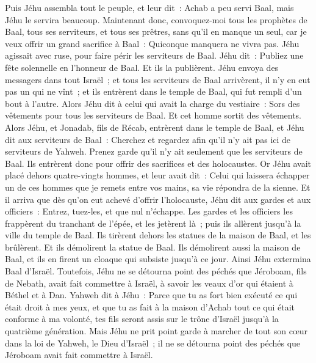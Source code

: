 \begin{multicols}{2}
Puis Jéhu assembla tout le peuple, et leur dit~: Achab a peu servi Baal, mais Jéhu le servira beaucoup.
Maintenant donc, convoquez-moi tous les prophètes de Baal, tous ses serviteurs, et tous ses prêtres, sans qu'il en manque un seul, car je veux offrir un grand sacrifice à Baal~: Quiconque manquera ne vivra pas. Jéhu agissait avec ruse, pour faire périr les serviteurs de Baal.
Jéhu dit~: Publiez une fête solennelle en l'honneur de Baal. Et ils la publièrent.
Jéhu envoya des messagers dans tout Israël~; et tous les serviteurs de Baal arrivèrent, il n'y en eut pas un qui ne vînt~; et ils entrèrent dans le temple de Baal, qui fut rempli d'un bout à l'autre.
Alors Jéhu dit à celui qui avait la charge du vestiaire~: Sors des vêtements pour tous les serviteurs de Baal. Et cet homme sortit des vêtements.
Alors Jéhu, et Jonadab, fils de Récab, entrèrent dans le temple de Baal, et Jéhu dit aux serviteurs de Baal~: Cherchez et regardez afin qu'il n'y ait pas ici de serviteurs de Yahweh. Prenez garde qu'il n'y ait seulement que les serviteurs de Baal.
Ils entrèrent donc pour offrir des sacrifices et des holocaustes. Or Jéhu avait placé dehors quatre-vingts hommes, et leur avait dit~: Celui qui laissera échapper un de ces hommes que je remets entre vos mains, sa vie répondra de la sienne.
Et il arriva que dès qu'on eut achevé d'offrir l'holocauste, Jéhu dit aux gardes et aux officiers~: Entrez, tuez-les, et que nul n'échappe. Les gardes et les officiers les frappèrent du tranchant de l'épée, et les jetèrent là~; puis ils allèrent jusqu'à la ville du temple de Baal.
Ils tirèrent dehors les statues de la maison de Baal, et les brûlèrent.
Et ils démolirent la statue de Baal. Ils démolirent aussi la maison de Baal, et ils en firent un cloaque qui subsiste jusqu'à ce jour.
Ainsi Jéhu extermina Baal d'Israël.
Toutefois, Jéhu ne se détourna point des péchés que Jéroboam, fils de Nebath, avait fait commettre à Israël, à savoir les veaux d'or qui étaient à Béthel et à Dan.
Yahweh dit à Jéhu~: Parce que tu as fort bien exécuté ce qui était droit à mes yeux, et que tu as fait à la maison d'Achab tout ce qui était conforme à ma volonté, tes fils seront assis sur le trône d'Israël jusqu'à la quatrième génération.
Mais Jéhu ne prit point garde à marcher de tout son cœur dans la loi de Yahweh, le Dieu d'Israël~; il ne se détourna point des péchés que Jéroboam avait fait commettre à Israël.

\end{multicols}
